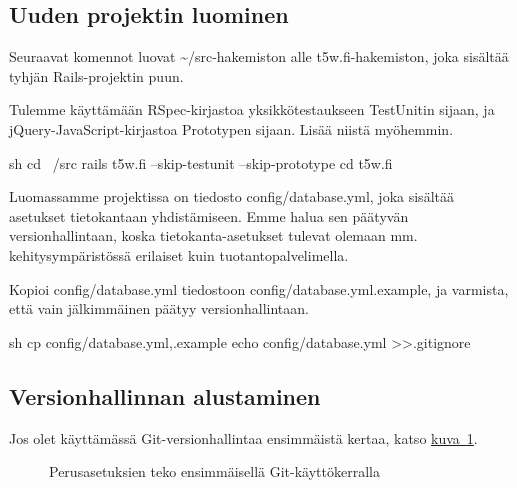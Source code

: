 \documentclass{article}
\newenvironment{myfigure}{
  \begin{figure}
    \centering
    \begin{lrbox}{\myfigurebox}
      \begin{minipage}{0.8\textwidth}
}{
      \end{minipage}
    \end{lrbox}
    \fcolorbox{blue}{blue!1}{\usebox{\myfigurebox}}
  \end{figure}
}
\newcommand{\en}[1]{\foreignlanguage{english}{#1}}
\begin{document}
\subsection{Uuden projektin luominen}

\begin{samepage}
Seuraavat komennot luovat \textasciitilde/src-hakemiston alle
t5w.fi-hakemiston, joka sisältää tyhjän Rails-projektin puun.

Tulemme käyttämään RSpec-kirjastoa yksikkötestaukseen TestUnitin sijaan, ja
jQuery-JavaScript-kirjastoa Prototypen sijaan. Lisää niistä myöhemmin.

\begin{pygmented}{sh}
cd ~/src
rails t5w.fi --skip-testunit --skip-prototype
cd t5w.fi
\end{pygmented}
\end{samepage}

Luomassamme projektissa on tiedosto \en{config/database.yml}, joka sisältää
asetukset tietokantaan yhdistämiseen. Emme halua sen päätyvän
versionhallintaan, koska tietokanta-asetukset tulevat olemaan mm.
kehitysympäristössä erilaiset kuin tuotantopalvelimella.

\begin{samepage}
Kopioi \en{config/database.yml} tiedostoon \en{config/database.yml.example}, ja
varmista, että vain jälkimmäinen päätyy versionhallintaan.

\begin{pygmented}{sh}
cp config/database.yml{,.example}
echo config/database.yml >>.gitignore
\end{pygmented}
\end{samepage}

\subsection{Versionhallinnan alustaminen}

Jos olet käyttämässä Git-versionhallintaa ensimmäistä kertaa, katso
\hyperref[fig:git-initial-config]{kuva~\ref*{fig:git-initial-config}}.

\begin{myfigure}
\caption{Perusasetuksien teko ensimmäisellä Git-käyttökerralla}
\label{fig:git-initial-config}
\end{myfigure}
\end{document}
